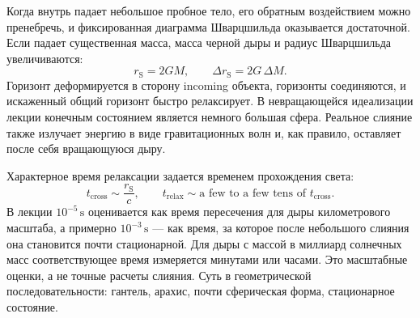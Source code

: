 Когда внутрь падает небольшое пробное тело, его обратным воздействием можно пренебречь, и фиксированная диаграмма Шварцшильда оказывается достаточной. Если падает существенная масса, масса черной дыры и радиус Шварцшильда увеличиваются:
\begin{equation}
r_{\mathrm S}=2GM,
\qquad
\Delta r_{\mathrm S}=2G\,\Delta M.
\label{eq:l7-growing-radius}
\end{equation}
Горизонт деформируется в сторону incoming объекта, горизонты соединяются, и искаженный общий горизонт быстро релаксирует. В невращающейся идеализации лекции конечным состоянием является немного большая сфера. Реальное слияние также излучает энергию в виде гравитационных волн и, как правило, оставляет после себя вращающуюся дыру.

\begin{classroomqa}
\end{classroomqa}

\begin{classroomqa}
\end{classroomqa}

Характерное время релаксации задается временем прохождения света:
\begin{equation}
t_{\mathrm{cross}}\sim\frac{r_{\mathrm S}}{c},
\qquad
t_{\mathrm{relax}}\sim
\text{a few to a few tens of }t_{\mathrm{cross}}.
\label{eq:l7-relaxation-scale}
\end{equation}
В лекции \(10^{-5}\,\mathrm{s}\) оценивается как время пересечения для дыры километрового масштаба, а примерно \(10^{-3}\,\mathrm{s}\) — как время, за которое после небольшого слияния она становится почти стационарной. Для дыры с массой в миллиард солнечных масс соответствующее время измеряется минутами или часами. Это масштабные оценки, а не точные расчеты слияния. Суть в геометрической последовательности: гантель, арахис, почти сферическая форма, стационарное состояние.

